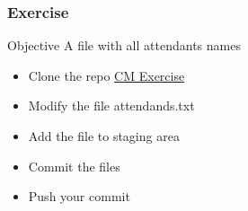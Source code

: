 \begin{frame}

\frametitle{Exercise}

\begin{block}{Objective}
A file with all attendants names
\end{block}

\begin{itemize}[<+->]
\item Clone the repo \href{https://gitlab.ice.csic.es/emiliogq/cm-exercise}{CM Exercise}
\item Modify the file attendands.txt
\item Add the file to staging area
\item Commit the files
\item Push your commit
\end{itemize}

\end{frame}
